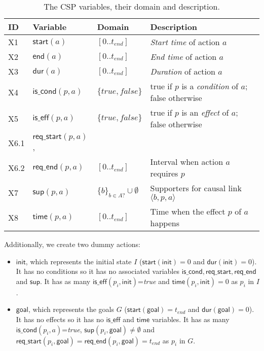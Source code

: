 \documentclass{ecai}
\newcommand{\tup}[1]{{\langle #1 \rangle}}
\newcommand{\dur}{\mathsf{dur}}    %
\newcommand{\iscond}{\mathsf{is\_cond}}    %
\newcommand{\iseff}{\mathsf{is\_eff}}    %
\newcommand{\start}{\mathsf{start}}%
\newcommand{\en}{\mathsf{end}}     %
\newcommand{\supp}{\mathsf{sup}}   %
\newcommand{\tim}{\mathsf{time}}   %
\newcommand{\reqs}{\mathsf{req\_{start}}} %
\newcommand{\reqe}{\mathsf{req\_{end}}}   %
\newcommand{\ini}{\mathsf{init}}   %
\newcommand{\goal}{\mathsf{goal}}  %
\begin{document}
\begin{table}
\begin{center}
\caption{The CSP variables, their domain and description.}
\begin{scriptsize}
\begin{tabular}{p{0.3cm}p{1.3cm}p{1.5cm}p{3.8cm}}
	\hline	
	{\bf ID} & {\bf Variable} & {\bf Domain} & {\bf Description} \\
	\hline
	X1 &$\start(a)$ & $[0..t_{end}]$ & {\em Start time} of action $a$ \\
	X2 &$\en(a)$ & $[0..t_{end}]$ & {\em End time} of action $a$ \\
	X3 &$\dur(a)$ & $[0..t_{end}]$ & {\em Duration} of action $a$ \\
	
	X4 &$\iscond(p,a)$ & $\{true,false\}$ & true if $p$ is a {\em condition} of $a$; false otherwise \\
	X5 &$\iseff(p,a)$ & $\{true,false\}$ & true if $p$ is an {\em effect} of $a$; false otherwise \\
	
	X6.1 &$\reqs(p,a)$, &  & \\ 
	X6.2 &$\reqe(p,a)$  & $[0..t_{end}]$ & Interval when action $a$ requires $p$ \\
	
	X7 &$\supp(p,a)$ & $\{b\}_{b\in A?} \cup \emptyset $&  Supporters for causal link $\tup{b,p,a}$ \\ 
	X8 &$\tim(p,a)$ & $[0..t_{end}]$ & Time when the effect $p$ of $a$ happens\\
	
\end{tabular}
\end{scriptsize}
\label{table:variables}
\end{center}
\end{table}


Additionally, we create two dummy actions:

\begin{itemize}
	
	\item $\ini$, which represents the initial state $I$ ($\start(\ini)=0$ and $\dur(\ini)=0$). It has no conditions so it has no associated variables $\iscond, \reqs, \reqe$ and $\supp$. It has as many $\iseff(p_i,\ini)$=\textit{true} and $\tim(p_i,\ini)=0$ as $p_i$ in $I$.
	
	\item $\goal$, which represents the goals $G$ ($\start(\goal)=t_{end}$ and $\dur(\goal)=0$). It has no effects so it has no $\iseff$ and $\tim$ variables. It has as many $\iscond(p_i,a)$=\textit{true}, $\supp(p_i,\goal)\neq \emptyset$ and $\reqs(p_i,\goal)=\reqe(p_i,\goal)=t_{end}$ as $p_i$ in $G$. 
\end{itemize}  
\end{document}
